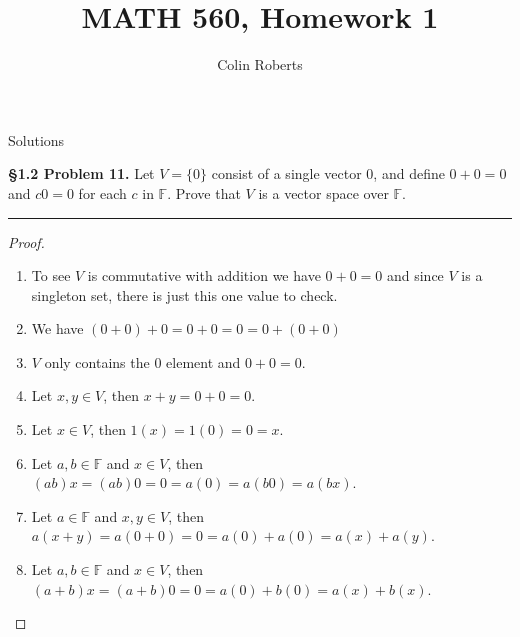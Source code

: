 \documentclass[leqno]{article}
\author{Colin Roberts}
\title{MATH 560, Homework 1}
\theoremstyle{nonumberplain}
\newtheorem{proof}{Proof}
\begin{document}
\maketitle
\begin{large}
\begin{center}
Solutions
\end{center}
\end{large}
\pagebreak

\noindent\textbf{\S 1.2 Problem 11.} Let $V = \{0\}$ consist of a single vector $0$, and define $0+0=0$ and $c0=0$ for each $c$ in $\mathbb{F}$.  Prove that $V$ is a vector space over $\mathbb{F}$.

\noindent\rule[0.5ex]{\linewidth}{1pt}

\begin{proof} ~\linebreak
\begin{enumerate}[(1)]
\item To see $V$ is commutative with addition we have $0+0=0$ and since $V$ is a singleton set, there is just this one value to check.
\item We have $(0+0)+0=0+0=0=0+(0+0)$
\item $V$ only contains the $0$ element and $0+0=0$.
\item Let $x,y\in V$, then $x+y=0+0=0$.
\item Let $x\in V$, then $1(x)=1(0)=0=x$.
\item Let $a,b\in \mathbb{F}$ and $x\in V$, then $(ab)x=(ab)0=0=a(0)=a(b0)=a(bx)$.
\item Let $a\in\mathbb{F}$ and $x,y \in V$, then $a(x+y)=a(0+0)=0=a(0)+a(0)=a(x)+a(y)$.
\item Let $a,b \in \mathbb{F}$ and $x\in V$, then $(a+b)x=(a+b)0=0=a(0)+b(0)=a(x)+b(x)$.
\end{enumerate}
\end{proof}

\pagebreak

\end{document}
